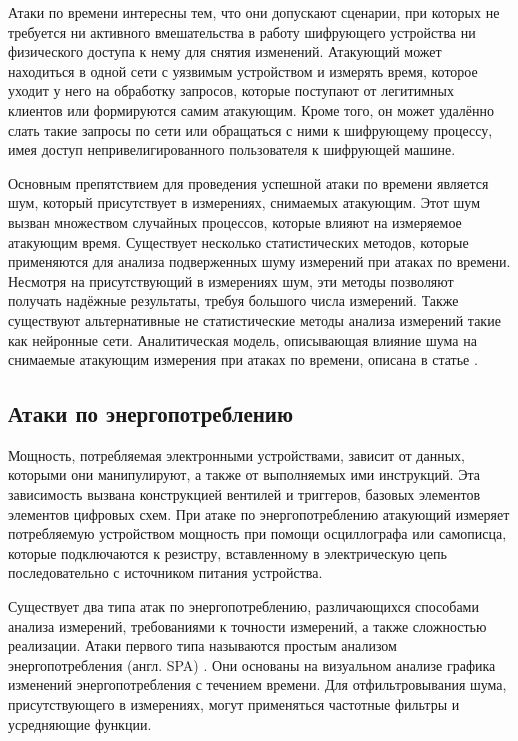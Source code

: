 Атаки по времени интересны тем, что они допускают сценарии, при которых
не требуется ни активного вмешательства в работу шифрующего устройства ни
физического доступа к нему для снятия изменений. Атакующий может находиться в
одной сети с уязвимым устройством и измерять время, которое уходит у него на
обработку запросов, которые поступают от легитимных клиентов или формируются
самим атакующим. Кроме того, он может удалённо слать такие запросы по сети
или обращаться с ними к шифрующему процессу, имея доступ непривелигированного
пользователя к шифрующей машине.

Основным препятствием для проведения успешной атаки по времени является шум,
который присутствует в измерениях, снимаемых атакующим. Этот шум вызван
множеством случайных процессов, которые влияют на измеряемое атакующим время.
Существует несколько статистических методов, которые применяются для анализа
подверженных шуму измерений при атаках по времени. Несмотря на присутствующий
в измерениях шум, эти методы позволяют получать надёжные результаты, требуя
большого числа измерений. Также существуют альтернативные не статистические
методы анализа измерений такие как нейронные сети. Аналитическая модель,
описывающая влияние шума на снимаемые атакующим измерения при атаках по времени,
описана в статье \cite{anmodel}.

\subsection{Атаки по энергопотреблению}

Мощность, потребляемая электронными устройствами, зависит от данных, которыми
они манипулируют, а также от выполняемых ими инструкций. Эта зависимость вызвана
конструкцией вентилей и триггеров, базовых элементов элементов цифровых схем.
При атаке по энергопотреблению атакующий измеряет потребляемую устройством
мощность при помощи осциллографа или самописца, которые подключаются к резистру,
вставленному в электрическую цепь последовательно с источником питания устройства.

Существует два типа атак по энергопотреблению, различающихся способами анализа
измерений, требованиями к точности измерений, а также сложностью реализации.
Атаки первого типа называются простым анализом энергопотребления (англ. SPA)
\cite{spa} \cite{spa1} \cite{kocher-dpa}. Они основаны на визуальном анализе
графика изменений энергопотребления с течением времени. Для отфильтровывания
шума, присутствующего в измерениях, могут применяться частотные фильтры и
усредняющие функции.

